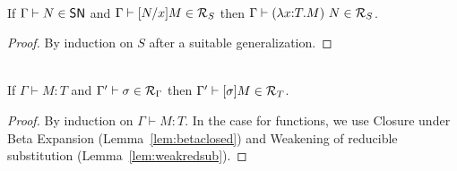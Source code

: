\begin{lemma}\label{lem:betaclosed}\mbox{} \\
If $\Gamma \vdash N \in \mathsf{SN}$ 
and $\Gamma \vdash [N/x]M\in \mathcal{R}_{S} $ %
then $\Gamma \vdash (\lambda x{:}T.M)~N\in \mathcal{R}_{S} $.
\end{lemma}
\begin{proof}
  By induction on $S$ after a suitable generalization.
\end{proof}
%
\begin{theorem}
\label{thm:fund}\mbox{} \\
If $\Gamma  \vdash M : T$ 
and $\Gamma' \vdash \sigma\in \mathcal{R}_{\Gamma} $ 
then $\Gamma' \vdash [\sigma]M\in \mathcal{R}_{T} $.
\end{theorem}
\begin{proof}
  By induction on $\Gamma \vdash M : T$. In the case for functions, we
  use Closure under Beta Expansion (Lemma~\ref{lem:betaclosed}) and
  Weakening of reducible substitution (Lemma~\ref{lem:weakredsub}).
\end{proof}




